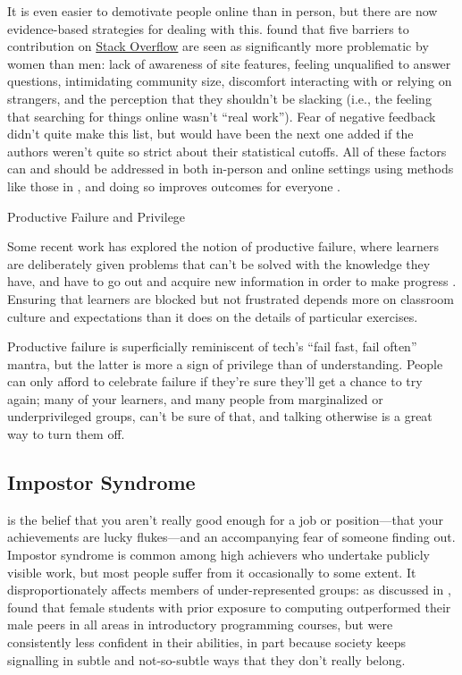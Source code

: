 It is even easier to demotivate people online than in person, but
there are now evidence-based strategies for dealing with this.
\cite{Ford2016} found that five barriers to contribution on
\href{https://stackoverflow.com/}{Stack Overflow} are seen as
significantly more problematic by women than men: lack of awareness of
site features, feeling unqualified to answer questions, intimidating
community size, discomfort interacting with or relying on strangers,
and the perception that they shouldn't be slacking (i.e., the feeling
that searching for things online wasn't ``real work'').  Fear of
negative feedback didn't quite make this list, but would have been the
next one added if the authors weren't quite so strict about their
statistical cutoffs.  All of these factors can and should be addressed
in both in-person and online settings using methods like those in
, and doing so improves outcomes for
everyone \cite{Sved2016}.

\begin{callout}{Productive Failure and Privilege}

  Some recent work has explored the notion of productive failure,
  where learners are deliberately given problems that can't be solved
  with the knowledge they have, and have to go out and acquire new
  information in order to make progress \cite{Kapu2016}.  Ensuring
  that learners are blocked but not frustrated depends more on
  classroom culture and expectations than it does on the details of
  particular exercises.

  Productive failure is superficially reminiscent of tech's ``fail
  fast, fail often'' mantra, but the latter is more a sign of
  privilege than of understanding.  People can only afford to
  celebrate failure if they're sure they'll get a chance to try again;
  many of your learners, and many people from marginalized or
  underprivileged groups, can't be sure of that, and talking otherwise
  is a great way to turn them off.

\end{callout}

\subsection*{Impostor Syndrome}

 is the belief that
you aren't really good enough for a job or position---that your
achievements are lucky flukes---and an accompanying fear of someone
finding out.  Impostor syndrome is common among high achievers who
undertake publicly visible work, but most people suffer from it
occasionally to some extent.  It disproportionately affects members of
under-represented groups: as discussed in ,
\cite{Wilc2018} found that female students with prior exposure to
computing outperformed their male peers in all areas in introductory
programming courses, but were consistently less confident in their
abilities, in part because society keeps signalling in subtle and
not-so-subtle ways that they don't really belong.

